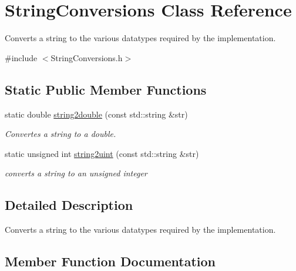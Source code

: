 \hypertarget{class_string_conversions}{}\section{String\+Conversions Class Reference}
\label{class_string_conversions}


Converts a string to the various datatypes required by the implementation.  




{\ttfamily \#include $<$String\+Conversions.\+h$>$}

\subsection*{Static Public Member Functions}
\begin{DoxyCompactItemize}
\item 
static double \hyperlink{class_string_conversions_aa48474d8bc56726261b8d7e13c4c4ab5}{string2double} (const std\+::string \&str)
\begin{DoxyCompactList}\small\item\em Convertes a string to a double. \end{DoxyCompactList}\item 
static unsigned int \hyperlink{class_string_conversions_a74a58903eb2c9971a0fe3ededbde9504}{string2uint} (const std\+::string \&str)
\begin{DoxyCompactList}\small\item\em converts a string to an unsigned integer \end{DoxyCompactList}\end{DoxyCompactItemize}


\subsection{Detailed Description}
Converts a string to the various datatypes required by the implementation. 

\subsection{Member Function Documentation}
\mbox{\label{class_string_conversions_aa48474d8bc56726261b8d7e13c4c4ab5}} 
